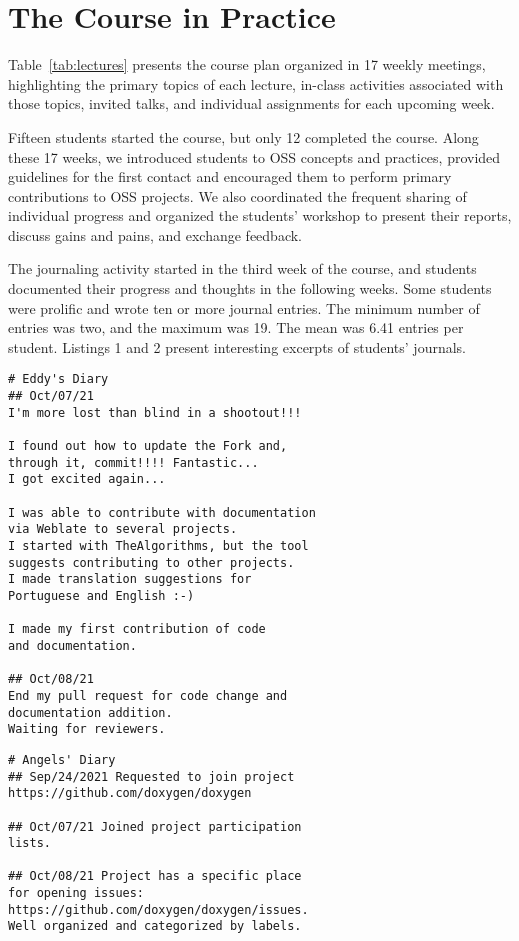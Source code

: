 \documentclass[sigconf]{acmart}
\begin{document}
\section{The Course in Practice}
\label{sec:weeks}

Table~\ref{tab:lectures} presents the course plan organized in 17 weekly meetings, highlighting the primary topics of each lecture, in-class activities associated with those topics, invited talks, and individual assignments for each upcoming week.
%

Fifteen students started the course, but only 12 completed the course.
Along these 17 weeks, we introduced students to OSS concepts and practices, 
provided guidelines for the first contact and 
encouraged them to perform primary contributions to OSS projects.
We also coordinated the frequent sharing of individual progress 
and organized the students' workshop to present their reports, 
discuss gains and pains, and exchange feedback.



The journaling activity started in the third week of the course, 
and students documented their progress and thoughts in the following weeks. 
Some students were prolific and wrote ten or more journal entries. 
The minimum number of entries was two, and the maximum was 19. 
The mean was 6.41 entries per student. 
Listings 1 and 2 present interesting excerpts of students' journals.


\begin{lstlisting}[caption=Example of Journal Entry.]
# Eddy's Diary
## Oct/07/21
I'm more lost than blind in a shootout!!!

I found out how to update the Fork and, 
through it, commit!!!! Fantastic...
I got excited again...

I was able to contribute with documentation 
via Weblate to several projects. 
I started with TheAlgorithms, but the tool 
suggests contributing to other projects. 
I made translation suggestions for 
Portuguese and English :-)

I made my first contribution of code 
and documentation.

## Oct/08/21
End my pull request for code change and 
documentation addition. 
Waiting for reviewers.
\end{lstlisting}

\begin{lstlisting}[caption=Another example of Journal Entry.]
# Angels' Diary
## Sep/24/2021 Requested to join project
https://github.com/doxygen/doxygen

## Oct/07/21 Joined project participation
lists.

## Oct/08/21 Project has a specific place 
for opening issues: 
https://github.com/doxygen/doxygen/issues. 
Well organized and categorized by labels.
\end{lstlisting} 
\end{document}
